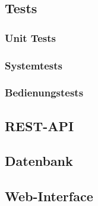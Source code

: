 \subsection{Tests}
  \blindtext
  \subsubsection{Unit Tests}
  \subsubsection{Systemtests}
  \subsubsection{Bedienungstests}
\subsection{REST-API}
  \blindtext
\subsection{Datenbank}
  \blindtext
\subsection{Web-Interface}
  \blindtext
